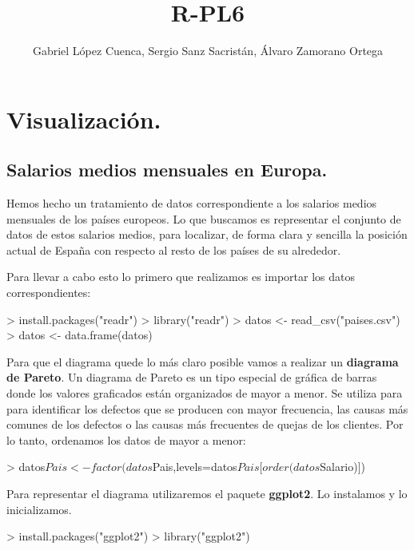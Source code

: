 \documentclass [a4paper] {article}
\title{R-PL6}
\author{Gabriel López Cuenca, Sergio Sanz Sacristán, Álvaro Zamorano Ortega}
\begin{document}


\maketitle

\graphicspath{ {./tmp/} }

\section{Visualización.}

\subsection{Salarios medios mensuales en Europa.}
\bigskip
Hemos hecho un tratamiento de datos correspondiente a los salarios medios mensuales de los países europeos.
Lo que buscamos es representar el conjunto de datos de estos salarios medios, para localizar, de forma clara
y sencilla la posición actual de España con respecto al resto de los países de su alrededor.

\bigskip
Para llevar a cabo esto lo primero que realizamos es importar los datos correspondientes:
\begin{Schunk}
\begin{Sinput}
> install.packages("readr")
> library("readr")
> datos <- read_csv("paises.csv")
> datos <- data.frame(datos)
\end{Sinput}
\end{Schunk}

\bigskip
Para que el diagrama quede lo más claro posible vamos a realizar un \textbf{diagrama de Pareto}. Un diagrama
de Pareto es un tipo especial de gráfica de barras donde los valores graficados están organizados de mayor a 
menor. Se utiliza para para identificar los defectos que se producen con mayor frecuencia, las causas más 
comunes de los defectos o las causas más frecuentes de quejas de los clientes. Por lo tanto, ordenamos los
datos de mayor a menor:
\begin{Schunk}
\begin{Sinput}
> datos$Pais <- factor(datos$Pais,levels=datos$Pais[order(datos$Salario)])
\end{Sinput}
\end{Schunk}

\bigskip
Para representar el diagrama utilizaremos el paquete \textbf{ggplot2}. Lo instalamos y lo inicializamos.
\begin{Schunk}
\begin{Sinput}
> install.packages("ggplot2")
> library("ggplot2")
\end{Sinput}
\end{Schunk}
\end{document}
